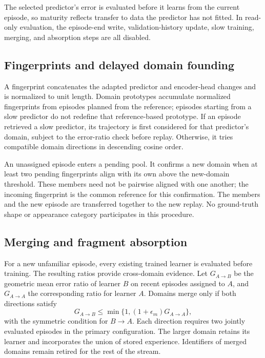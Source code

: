 The selected predictor's error is evaluated before it learns from the current episode, so maturity reflects transfer to data the predictor has not fitted. In read-only evaluation, the episode-end write, validation-history update, slow training, merging, and absorption steps are all disabled.

\subsection{Fingerprints and delayed domain founding}
A fingerprint concatenates the adapted predictor and encoder-head changes and is normalized to unit length. Domain prototypes accumulate normalized fingerprints from episodes planned from the reference; episodes starting from a slow predictor do not redefine that reference-based prototype. If an episode retrieved a slow predictor, its trajectory is first considered for that predictor's domain, subject to the error-ratio check before replay. Otherwise, it tries compatible domain directions in descending cosine order.

An unassigned episode enters a pending pool. It confirms a new domain when at least two pending fingerprints align with its own above the new-domain threshold. These members need not be pairwise aligned with one another; the incoming fingerprint is the common reference for this confirmation. The members and the new episode are transferred together to the new replay. No ground-truth shape or appearance category participates in this procedure.

\subsection{Merging and fragment absorption}
For a new unfamiliar episode, every existing trained learner is evaluated before training. The resulting ratios provide cross-domain evidence. Let $G_{A\to B}$ be the geometric mean error ratio of learner $B$ on recent episodes assigned to $A$, and $G_{A\to A}$ the corresponding ratio for learner $A$. Domains merge only if both directions satisfy
\begin{equation}
 G_{A\to B}\leq \min\{1,(1+\epsilon_m)G_{A\to A}\},
\end{equation}
with the symmetric condition for $B\to A$. Each direction requires two jointly evaluated episodes in the primary configuration. The larger domain retains its learner and incorporates the union of stored experience. Identifiers of merged domains remain retired for the rest of the stream.

